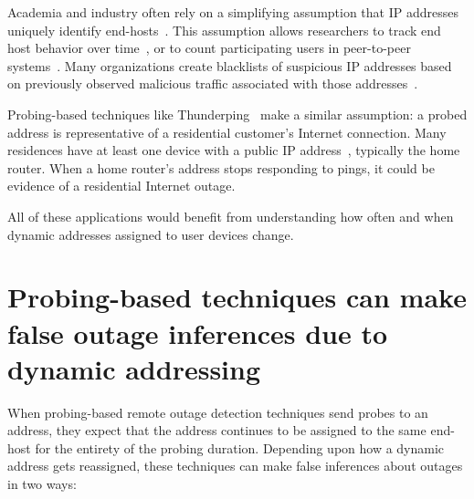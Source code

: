 \label{sec:addrs-are-host-proxies}

Academia and industry often rely on a simplifying assumption that IP
addresses uniquely identify
end-hosts~\cite{p2pfilesharing,p2pavail,sen2004analyzing,sekar2006multi,anomalousdns,kuhrer2015going,xie2005worm,jung2004empirical,fabian2007botnet,stone2009your,andriesse2015reliable,fail2ban,spamhaus,cbl,sorbs}. This
assumption allows researchers to track end host behavior over
time~\cite{anomalousdns, kuhrer2015going, pingin}, or to count
participating users in peer-to-peer
systems~\cite{p2pfilesharing,p2pavail,sen2004analyzing}. Many
organizations create blacklists of suspicious IP addresses based on
previously observed malicious traffic associated with those
addresses~\cite{fail2ban,spamhaus,cbl,sorbs}. 

Probing-based techniques like Thunderping~\cite{pingin} make a similar
assumption: a probed address is representative of a residential
customer's Internet connection. Many residences have at least one
device with a public IP address~\cite{cgn-imc16}, typically the home
router. When a home router's address stops responding
to pings, it could be evidence of a residential Internet outage.

All of these applications would benefit from understanding how often
and when dynamic addresses assigned to user devices change.

\section{Probing-based techniques can make false outage inferences due
to dynamic addressing}

\label{sec:addrchange-false-inferences}

When probing-based remote outage detection techniques send probes to an address, they expect that the
address continues to be assigned to the same end-host for the entirety
of the probing duration. Depending upon how a dynamic address gets
reassigned, these techniques can make false inferences about outages in two ways:

